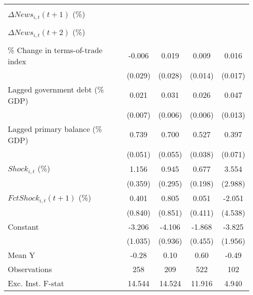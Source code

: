 {\begin{tabular}{l*{4}{c}}
                    &                     &                     &                     &                     \\
\addlinespace
$ \Delta News_{i,t}(t+1)$ (\%)&                     &                     &                     &                     \\
                    &                     &                     &                     &                     \\
\addlinespace
$ \Delta News_{i,t}(t+2)$ (\%)&                     &                     &                     &                     \\
                    &                     &                     &                     &                     \\
\addlinespace
\% Change in terms-of-trade index&      -0.006         &       0.019         &       0.009         &       0.016         \\
                    &     (0.029)         &     (0.028)         &     (0.014)         &     (0.017)         \\
\addlinespace
Lagged government debt (\% GDP)&       0.021\sym{**} &       0.031\sym{***}&       0.026\sym{***}&       0.047\sym{***}\\
                    &     (0.007)         &     (0.006)         &     (0.006)         &     (0.013)         \\
\addlinespace
Lagged primary balance (\% GDP)&       0.739\sym{***}&       0.700\sym{***}&       0.527\sym{***}&       0.397\sym{***}\\
                    &     (0.051)         &     (0.055)         &     (0.038)         &     (0.071)         \\
\addlinespace
$ Shock_{i,t}$ (\%) &       1.156\sym{***}&       0.945\sym{***}&       0.677\sym{***}&       3.554         \\
                    &     (0.359)         &     (0.295)         &     (0.198)         &     (2.988)         \\
\addlinespace
$ FctShock_{i,t}(t+1)$ (\%)&       0.401         &       0.805         &       0.051         &      -2.051         \\
                    &     (0.840)         &     (0.851)         &     (0.411)         &     (4.538)         \\
\addlinespace
Constant            &      -3.206\sym{***}&      -4.106\sym{***}&      -1.868\sym{***}&      -3.825\sym{*}  \\
                    &     (1.035)         &     (0.936)         &     (0.455)         &     (1.956)         \\
\midrule
Mean Y              &       -0.28         &        0.10         &        0.60         &       -0.49         \\
Observations        &         258         &         209         &         522         &         102         \\
Exc. Inst. F-stat   &      14.544         &      14.524         &      11.916         &       4.940         \\
\bottomrule
\end{tabular}
}
